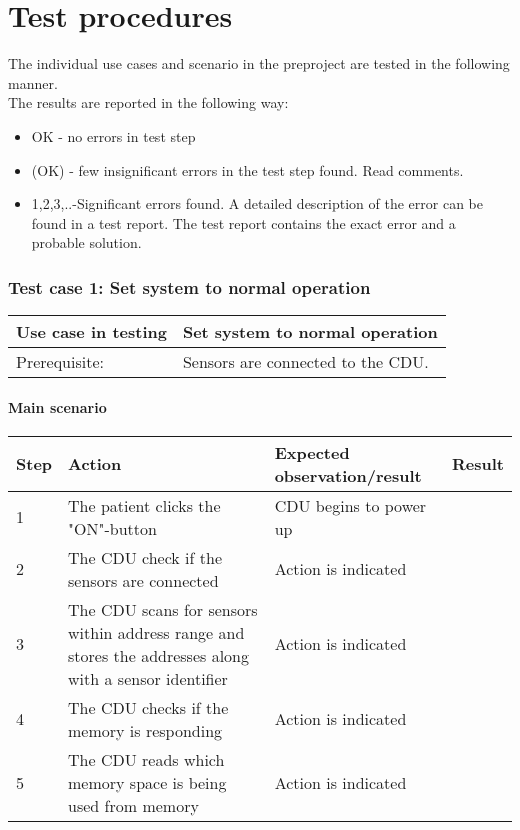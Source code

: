 \chapter{Test procedures}
The individual use cases and scenario in the %
preproject are tested in the following manner.\\

The results are reported in the following way:
\begin{itemize}[bullet]
\item OK - no errors in test step
\item (OK) - few insignificant errors in the test step found. Read comments.
\item 1,2,3,..-Significant errors found. A detailed description of  the error can be found in a test report. The test report contains the exact error and a probable solution.
\end{itemize}

\subsection{Test case 1: Set system to normal operation}
\begin{table}[H]
    \begin{tabular}{|l|p{7cm}|}
    \hline
    Use case in testing & Set system to normal operation \\ \hline
    Prerequisite: & Sensors are connected to the CDU. \\ \hline
    \end{tabular}
\end{table}

\subsubsection{Main scenario}
\begin{table}[H]
    \begin{tabular}{|l|p{7cm}|p{5cm}|l|}
    \hline
    Step & Action & Expected observation/result & Result \\ \hline
    1 & The patient clicks the "ON"-button & CDU begins to power up & ~ \\ \hline
    2 & The CDU check if the sensors are connected & Action is indicated & ~ \\ \hline
    3 & The CDU scans for sensors within address range and stores the addresses along with a sensor identifier & Action is indicated & ~ \\ \hline
    4 & The CDU checks if the memory is responding & Action is indicated & ~ \\ \hline
    5 & The CDU reads which memory space is being used from memory & Action is indicated & ~ \\ \hline
    \end{tabular}
\end{table}

